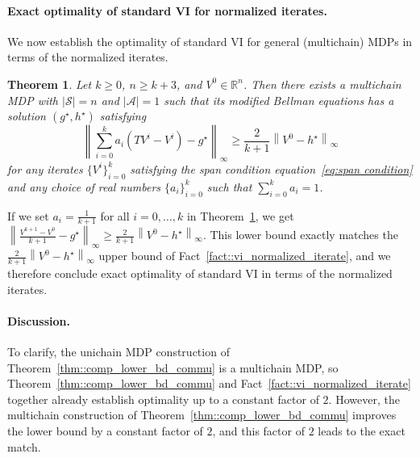 \documentclass{article} %
\def\eqref#1{equation~\ref{#1}}
\newcommand{\real}{\mathbb{R}}
\newcommand*{\infn}[1]{\left\|{#1}\right\|_{\infty}}
\newtheorem{theorem}{Theorem}
\begin{document}
\paragraph{Exact optimality of standard VI for normalized iterates.} 
We now establish the optimality of standard VI for general (multichain) MDPs in terms of the normalized iterates.
\begin{theorem}\label{thm::comp_lower_bd_multi}
Let $k\ge 0$, $n \ge k+3$, and $V^0 \in \real^n$. Then there exists a multichain MDP with $|\mathcal{S}|=n$ and $|\mathcal{A}|=1$ such that its modified Bellman equations has a solution $(g^\star,h^{\star})$ satisfying
\[ \infn{\sum^{k}_{i=0} a_i (TV^i-V^i)-g^{\star}} \ge \frac{2}{k+1}\infn{V^0-h^{\star}} \]
for any iterates $\{V^i\}^{k}_{i=0}$ satisfying the span condition \eqref{eq:span condition} and any choice of real numbers $\{a_i\}^k_{i=0}$ such that $\sum^k_{i=0}a_i=1 $.
\end{theorem}
If we set $a_i=\frac{1}{k+1}$ for all $i=0,\dots,k$ in Theorem~\ref{thm::comp_lower_bd_multi}, we get $\infn{\frac{V^{k+1}-V^0}{k+1}-g^{\star}} \ge \frac{2}{k+1}\infn{V^0-h^{\star}}$. 
This lower bound exactly matches the $\frac{2}{k+1}\infn{V^0-h^{\star}}$ upper bound of Fact~\ref{fact::vi_normalized_iterate}, and we therefore conclude exact optimality of standard VI in terms of the normalized iterates.




\paragraph{Discussion.}
To clarify, the unichain MDP construction of Theorem~\ref{thm::comp_lower_bd_commu} is a multichain MDP, so Theorem~\ref{thm::comp_lower_bd_commu} and Fact~\ref{fact::vi_normalized_iterate} together already establish optimality up to a constant factor of $2$. However, the multichain construction of Theorem~\ref{thm::comp_lower_bd_commu} improves the lower bound by a constant factor of $2$, and this factor of $2$ leads to the exact match.


\end{document}
